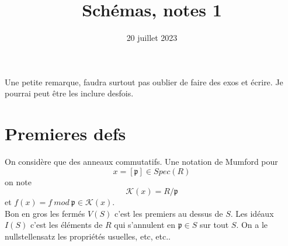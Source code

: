 \documentclass[12pt]{article}
\title{Schémas, notes 1}
\date{20 juillet 2023}
\newcommand{\p}{\mathfrak{p}}
\newcommand{\K}{\mathcal{K}}
\begin{document}
\tableofcontents
\maketitle
Une petite remarque, faudra surtout pas oublier de faire des exos et écrire. Je pourrai peut être les inclure desfois.
\section{Premieres defs}
On considère que des anneaux commutatifs. Une notation de Mumford pour $$x=[\p]\in Spec(R)$$ on note $$\K(x)=R/\p$$ et 
\textbf{$f(x)=f~mod~\p\in\K(x)$}. \\

\newline \indent Bon en gros les fermés $V(S)$ c'est les premiers au dessus de $S$.
Les idéaux $I(S)$ c'est les éléments de $R$ qui s'annulent en $\p\in S$ sur tout $S$.
On a le nullstellensatz les propriétés usuelles, etc, etc..
\end{document}
